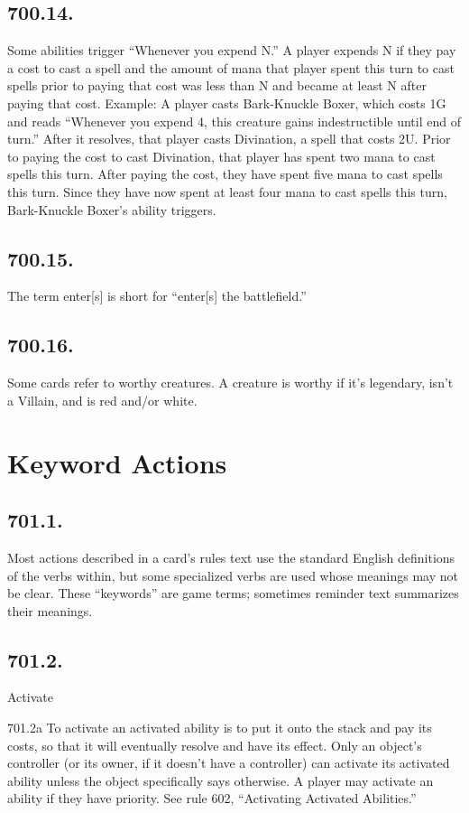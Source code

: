 \subsection*{700.14.}
Some abilities trigger “Whenever you expend N.” A player expends N if they pay a cost to cast a spell and the amount of mana that player spent this turn to cast spells prior to paying that cost was less than N and became at least N after paying that cost.
Example: A player casts Bark-Knuckle Boxer, which costs {1}{G} and reads “Whenever you expend 4, this creature gains indestructible until end of turn.” After it resolves, that player casts Divination, a spell that costs {2}{U}. Prior to paying the cost to cast Divination, that player has spent two mana to cast spells this turn. After paying the cost, they have spent five mana to cast spells this turn. Since they have now spent at least four mana to cast spells this turn, Bark-Knuckle Boxer’s ability triggers.

\subsection*{700.15.}
The term enter[s] is short for “enter[s] the battlefield.”

\subsection*{700.16.}
Some cards refer to worthy creatures. A creature is worthy if it’s legendary, isn’t a Villain, and is red and/or white.

\section{Keyword Actions}
\subsection*{701.1.}
Most actions described in a card’s rules text use the standard English definitions of the verbs within, but some specialized verbs are used whose meanings may not be clear. These “keywords” are game terms; sometimes reminder text summarizes their meanings.

\subsection*{701.2.}
Activate

701.2a To activate an activated ability is to put it onto the stack and pay its costs, so that it will eventually resolve and have its effect. Only an object’s controller (or its owner, if it doesn’t have a controller) can activate its activated ability unless the object specifically says otherwise. A player may activate an ability if they have priority. See rule 602, “Activating Activated Abilities.”

